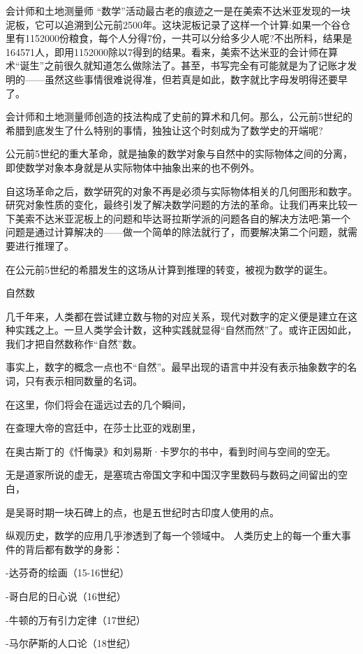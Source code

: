 会计师和土地测量师
“数学”活动最古老的痕迹之一是在美索不达米亚发现的一块泥板，它可以追溯到公元前2500年。这块泥板记录了这样一个计算:如果一个谷仓里有1152000份粮食，每个人分得7份，一共可以分给多少人呢?不出所料，结果是164571人，即用1152000除以7得到的结果。看来，美索不达米亚的会计师在算术“诞生”之前很久就知道怎么做除法了。甚至，书写完全有可能就是为了记账才发明的——虽然这些事情很难说得准，但若真是如此，数字就比字母发明得还要早了。

会计师和土地测量师创造的技法构成了史前的算术和几何。那么，公元前5世纪的希腊到底发生了什么特别的事情，独独让这个时刻成为了数学史的开端呢?


公元前5世纪的重大革命，就是抽象的数学对象与自然中的实际物体之间的分离，即使数学对象本身就是从实际物体中抽象出来的也不例外。

自这场革命之后，数学研究的对象不再是必须与实际物体相关的几何图形和数字。研究对象性质的变化，最终引发了解决数学问题的方法的革命。让我们再来比较一下美索不达米亚泥板上的问题和毕达哥拉斯学派的问题各自的解决方法吧:第一个问题是通过计算解决的——做一个简单的除法就行了，而要解决第二个问题，就需要进行推理了。

在公元前5世纪的希腊发生的这场从计算到推理的转变，被视为数学的诞生。


自然数

几千年来，人类都在尝试建立数与物的对应关系，现代对数字的定义便是建立在这种实践之上。一旦人类学会计数，这种实践就显得“自然而然”了。或许正因如此，我们才把自然数称作“自然”数。

事实上，数字的概念一点也不“自然”。最早出现的语言中并没有表示抽象数字的名词，只有表示相同数量的名词。

在这里，你们将会在遥远过去的几个瞬间，

在查理大帝的宫廷中，在莎士比亚的戏剧里，

在奥古斯丁的《忏悔录》和刘易斯·卡罗尔的书中，看到时间与空间的空无。

无是道家所说的虚无，是塞琉古帝国文字和中国汉字里数码与数码之间留出的空白，

是吴哥时期一块石碑上的点，也是五世纪时古印度人使用的点。




纵观历史，数学的应用几乎渗透到了每一个领域中。
人类历史上的每一个重大事件的背后都有数学的身影：

-达芬奇的绘画（15-16世纪）

-哥白尼的日心说（16世纪）

-牛顿的万有引力定律（17世纪）

-马尔萨斯的人口论（18世纪）

